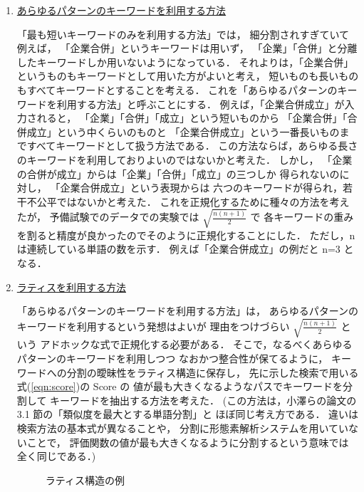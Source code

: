 \begin{enumerate}
\item 
\underline{あらゆるパターンのキーワードを利用する方法}

「最も短いキーワードのみを利用する方法」では，
細分割されすぎていて例えば，
「企業合併」というキーワードは用いず，
「企業」「合併」と分離したキーワードしか用いないようになっている．
それよりは，「企業合併」というものもキーワードとして用いた方がよいと考え，
短いものも長いものもすべてキーワードとすることを考える．
これを「あらゆるパターンのキーワードを利用する方法」と呼ぶことにする．
例えば，「企業合併成立」が入力されると，
「企業」「合併」「成立」という短いものから
「企業合併」「合併成立」という中くらいのものと
「企業合併成立」という一番長いものまですべてキーワードとして扱う方法である．
この方法ならば，あらゆる長さのキーワードを利用しておりよいのではないかと考えた．
しかし，
「企業の合併が成立」からは「企業」「合併」「成立」の三つしか
得られないのに対し，
「企業合併成立」という表現からは
六つのキーワードが得られ，若干不公平ではないかと考えた．
これを正規化するために種々の方法を考えたが，
予備試験でのデータでの実験では $\sqrt{\frac{n(n+1)}{2}}$ で
各キーワードの重みを割ると精度が良かったのでそのように正規化することにした．
ただし，n は連続している単語の数を示す．
例えば「企業合併成立」の例だと n=3 となる．

\item 
\underline{ラティスを利用する方法}

「あらゆるパターンのキーワードを利用する方法」は，
あらゆるパターンのキーワードを利用するという発想はよいが 
理由をつけづらい $\sqrt{\frac{n(n+1)}{2}}$ という
アドホックな式で正規化する必要がある．
そこで，なるべくあらゆるパターンのキーワードを利用しつつ
なおかつ整合性が保てるように，
キーワードへの分割の曖昧性をラティス構造に保存し，
先に示した検索で用いる式(\ref{eqn:score})の Score の
値が最も大きくなるようなパスでキーワードを分割して
キーワードを抽出する方法を考えた．
(この方法は，小澤らの論文\cite{ozawa_nlp99}の
3.1 節の「類似度を最大とする単語分割」と
ほぼ同じ考え方である．
違いは検索方法の基本式が異なることや，
分割に形態素解析システムを用いていないことで，
評価関数の値が最も大きくなるように分割するという意味では
全く同じである．)

\begin{figure}[t]
  \begin{center}
  \begin{minipage}{7cm}
      \begin{center}
      \end{center}
    \caption{ラティス構造の例}
    \label{fig:lattice}
    \end{minipage}
  \end{center}
\end{figure}


\end{enumerate}
